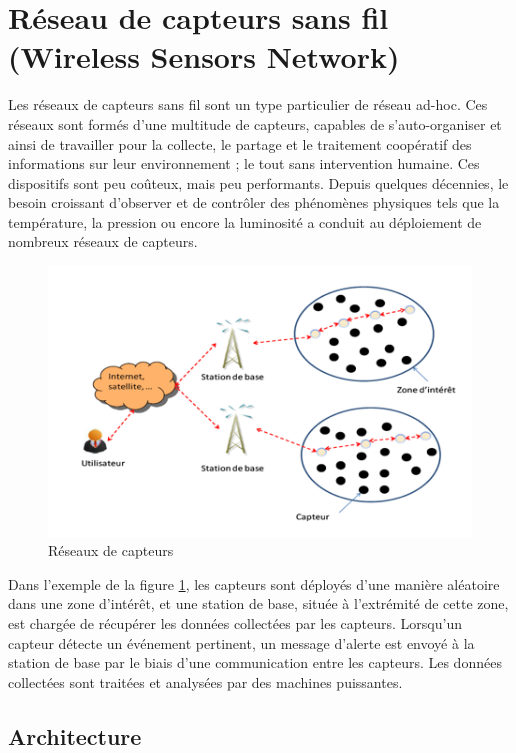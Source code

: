 \section{Réseau de capteurs sans fil (Wireless Sensors Network)}
Les réseaux de capteurs sans fil sont un type particulier de réseau ad-hoc. Ces réseaux sont formés d’une multitude de capteurs, capables de s’auto-organiser et ainsi de travailler pour la collecte, le partage et le traitement coopératif des informations sur leur environnement ; le tout sans intervention humaine. Ces dispositifs sont peu coûteux, mais peu performants. Depuis quelques décennies, le besoin croissant d’observer et de contrôler des phénomènes physiques tels que la température, la pression ou encore la luminosité a conduit au déploiement de nombreux réseaux de capteurs.

\begin{figure}[h]
\centering
\includegraphics[scale=0.5]{Intro/WSN}
\caption{\label{WSN} Réseaux de capteurs}
\end{figure}

Dans l'exemple de la figure \ref{WSN}, les capteurs sont déployés d’une manière aléatoire dans une zone d’intérêt, et une station de base, située à l’extrémité de cette zone, est chargée de récupérer les données collectées par les capteurs. Lorsqu’un capteur détecte un événement pertinent, un message d’alerte est envoyé à la station de base par le biais d’une  communication entre les capteurs. Les données collectées sont traitées et analysées par des machines puissantes.



\subsection{Architecture}



